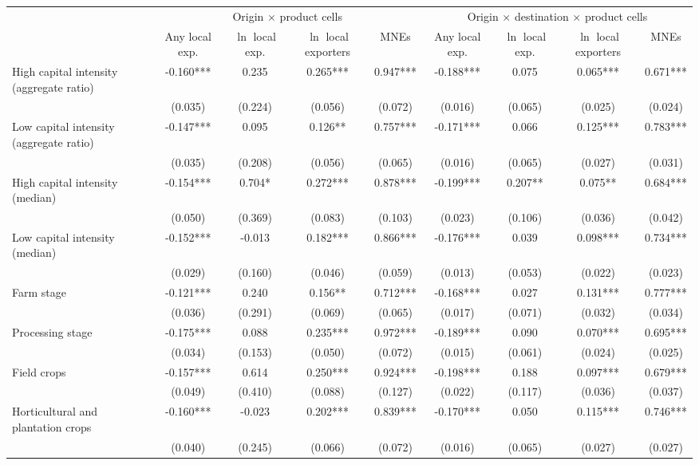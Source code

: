 \begin{tabular}{l*{8}{c}}
\toprule
 & \multicolumn{4}{c}{Origin $\times$ product cells} & \multicolumn{4}{c}{Origin $\times$ destination $\times$ product cells} \\
\cmidrule(lr){2-5}\cmidrule(lr){6-9}
 & Any local exp. & $\ln$ local exp. & $\ln$ local exporters & MNEs & Any local exp. & $\ln$ local exp. & $\ln$ local exporters & MNEs \\
\midrule
High capital intensity (aggregate ratio) & -0.160*** & 0.235 & 0.265*** & 0.947*** & -0.188*** & 0.075 & 0.065*** & 0.671*** \\
 & (0.035) & (0.224) & (0.056) & (0.072) & (0.016) & (0.065) & (0.025) & (0.024) \\
Low capital intensity (aggregate ratio) & -0.147*** & 0.095 & 0.126** & 0.757*** & -0.171*** & 0.066 & 0.125*** & 0.783*** \\
 & (0.035) & (0.208) & (0.056) & (0.065) & (0.016) & (0.065) & (0.027) & (0.031) \\
High capital intensity (median) & -0.154*** & 0.704* & 0.272*** & 0.878*** & -0.199*** & 0.207** & 0.075** & 0.684*** \\
 & (0.050) & (0.369) & (0.083) & (0.103) & (0.023) & (0.106) & (0.036) & (0.042) \\
Low capital intensity (median) & -0.152*** & -0.013 & 0.182*** & 0.866*** & -0.176*** & 0.039 & 0.098*** & 0.734*** \\
 & (0.029) & (0.160) & (0.046) & (0.059) & (0.013) & (0.053) & (0.022) & (0.023) \\
Farm stage & -0.121*** & 0.240 & 0.156** & 0.712*** & -0.168*** & 0.027 & 0.131*** & 0.777*** \\
 & (0.036) & (0.291) & (0.069) & (0.065) & (0.017) & (0.071) & (0.032) & (0.034) \\
Processing stage & -0.175*** & 0.088 & 0.235*** & 0.972*** & -0.189*** & 0.090 & 0.070*** & 0.695*** \\
 & (0.034) & (0.153) & (0.050) & (0.072) & (0.015) & (0.061) & (0.024) & (0.025) \\
Field crops & -0.157*** & 0.614 & 0.250*** & 0.924*** & -0.198*** & 0.188 & 0.097*** & 0.679*** \\
 & (0.049) & (0.410) & (0.088) & (0.127) & (0.022) & (0.117) & (0.036) & (0.037) \\
Horticultural and plantation crops & -0.160*** & -0.023 & 0.202*** & 0.839*** & -0.170*** & 0.050 & 0.115*** & 0.746*** \\
 & (0.040) & (0.245) & (0.066) & (0.072) & (0.016) & (0.065) & (0.027) & (0.027) \\

\end{tabular}
